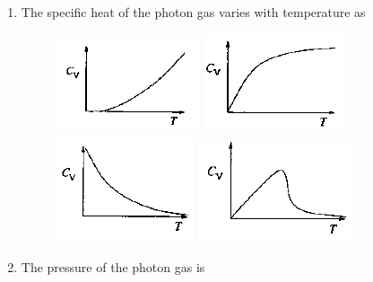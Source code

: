 \documentclass[journal,12pt,onecolumn]{IEEEtran}
\theoremstyle{remark}
\begin{document}
\begin{enumerate}
\item The specific heat of the photon gas varies with temperature as\hfill{}
\begin{figure}[H]
	\centering
	\caption*{} \label{50a} \includegraphics[width=0.35\columnwidth]{figs/50a.png}
	\caption*{} \label{50b} \includegraphics[width=0.35\columnwidth]{figs/50b.png}
	\caption*{} \label{50c} \includegraphics[width=0.35\columnwidth]{figs/50c.png}
	\caption*{} \label{50d} \includegraphics[width=0.35\columnwidth]{figs/50d.png}
\end{figure}

\item The pressure of the photon gas is\hfill{}

\begin{enumerate}  \end{enumerate}


\end{enumerate}
\end{document}
